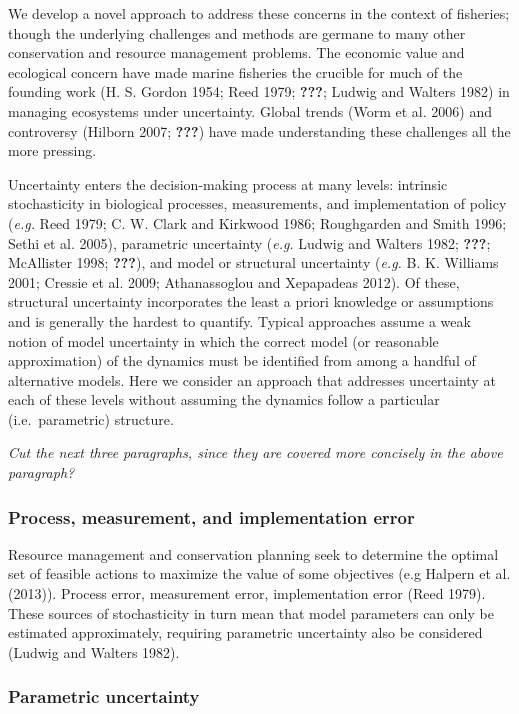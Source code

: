 \documentclass[author-year, review]{elsarticle} %
\begin{document}
We develop a novel approach to address these concerns in the context of
fisheries; though the underlying challenges and methods are germane to
many other conservation and resource management problems. The economic
value and ecological concern have made marine fisheries the crucible for
much of the founding work (H. S. Gordon 1954; Reed 1979; {\textbf{???}};
Ludwig and Walters 1982) in managing ecosystems under uncertainty.
Global trends (Worm et al. 2006) and controversy (Hilborn 2007;
{\textbf{???}}) have made understanding these challenges all the more
pressing.

Uncertainty enters the decision-making process at many levels: intrinsic
stochasticity in biological processes, measurements, and implementation
of policy (\emph{e.g.} Reed 1979; C. W. Clark and Kirkwood 1986;
Roughgarden and Smith 1996; Sethi et al. 2005), parametric uncertainty
(\emph{e.g.} Ludwig and Walters 1982; {\textbf{???}}; McAllister 1998;
{\textbf{???}}), and model or structural uncertainty (\emph{e.g.} B. K.
Williams 2001; Cressie et al. 2009; Athanassoglou and Xepapadeas 2012).
Of these, structural uncertainty incorporates the least a priori
knowledge or assumptions and is generally the hardest to quantify.
Typical approaches assume a weak notion of model uncertainty in which
the correct model (or reasonable approximation) of the dynamics must be
identified from among a handful of alternative models. Here we consider
an approach that addresses uncertainty at each of these levels without
assuming the dynamics follow a particular (i.e.~parametric) structure.

\emph{Cut the next three paragraphs, since they are covered more
concisely in the above paragraph?}

\subsubsection{Process, measurement, and implementation
error}\label{process-measurement-and-implementation-error}

Resource management and conservation planning seek to determine the
optimal set of feasible actions to maximize the value of some objectives
(e.g Halpern et al. (2013)). Process error, measurement error,
implementation error (Reed 1979). These sources of stochasticity in turn
mean that model parameters can only be estimated approximately,
requiring parametric uncertainty also be considered (Ludwig and Walters
1982).

\subsubsection{Parametric uncertainty}\label{parametric-uncertainty}
\end{document}
